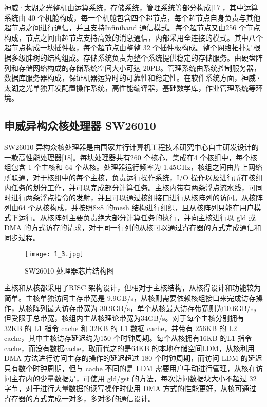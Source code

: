 神威·太湖之光整机由运算系统，存储系统，管理系统等部分构成[17]，其中运算系统由 40 个机舱构成，每一个机舱包含四个超节点，每个超节点自身负责与其他超节点之间进行通信，并且支持Infiniband 通信模式。每个超节点又由256 个节点构成，节点之间由超节点支持高效的消息通信，内部采用全连接的模式。其中八个超节点构成一块插件板，每个超节点由整整 32 个插件板构成。整个网络拓扑是根据多级胖树的结构组成。存储系统负责为整个系统提供稳定的存储服务。由硬盘阵列和存储网络构成的存储系统空间大小可达 20PB。管理系统由系统控制服务器，数据库服务器构成，保证机器运算时的可靠性和稳定性。在软件系统方面，神威·太湖之光单独开发配置操作系统，高性能编译器，基础数学库，作业管理系统等环境。
\subsection{申威异构众核处理器 SW26010}
SW26010 异构众核处理器是由国家并行计算机工程技术研究中心自主研发设计的一款高性能处理器[18]。每块处理器共有260 个核心，集成在4 个核组中，每个核组包含 1 个主核和 64 个从核。处理器运行频率为 1.45GHz，核组之间由片上网络所联通，对于核组中的每个主核，负责运行操作系统，I/O 操作以及进行所在核组内任务的划分工作，并可以完成部分计算任务。主核内带有两条浮点流水线，可同时进行两条浮点指令的发射，并且可以通过核组接口进行从核阵列的访问。从核阵列由64 个从核构成，并按照8x8 的mesh 结构进行组织，且从核阵列只能在用户模式下运行。从核阵列主要负责绝大部分计算任务的执行，并向主核进行以 gld 或 DMA 的方式访存的请求，对于同一行列的从核可以通过寄存器的方式完成通信和同步过程。

 \begin{figure}[h]
  \centering
  \texttt{[image: 1\_3.jpg]}
  \caption{SW26010 处理器芯片结构图}
  \label{fig:badge}
\end{figure}

主核和从核都采用了RISC 架构设计，但相对于主核结构，从核得设计和功能较为简单。主核单独访问主存带宽是 9.9GB/s，从核则需要依赖核组接口来完成访存操作，从核阵列最大访存带宽为 30.9GB/s，单个从核最大访存带宽则为10.6GB/s，但受限于总带宽，核组内主从核理论带宽为34GB/s。对于每个主核分别拥有 32KB 的 L1 指令 cache 和 32KB 的 L1 数据 cache，并带有 256KB 的 L2 cache，其中主核访存延迟约为150 个时钟周期。每个从核拥有16KB 的L1 指令cache，而没有数据cache，取而代之的是64KB 的本地存储空间LDM，从核利用DMA 方法进行访问主存的操作的延迟超过 180 个时钟周期，而访问 LDM 的延迟只有数个时钟周期，但与 cache 不同的是 LDM 需要用户手动进行管理，从核在访问主存内的少量数据是，可使用 gld/gst 的方法，每次访问数据块大小不超过 32 字节，对于进行大量数据的读写操作时使用 DMA 方式的性能更好，从核可通过寄存器的方式完成一对多，多对多的通信设计。


